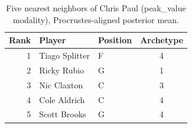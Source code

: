 \begin{table}[htbp]
  \centering\small
  \begin{tabular}{rllc}
    \toprule
    Rank & Player & Position & Archetype \\
    \midrule
    1 & Tiago Splitter & F & 4 \\
    2 & Ricky Rubio & G & 1 \\
    3 & Nic Claxton & C & 3 \\
    4 & Cole Aldrich & C & 4 \\
    5 & Scott Brooks & G & 4 \\
    \bottomrule
  \end{tabular}
  \caption{Five nearest neighbors of Chris Paul (peak_value modality), Procrustes-aligned posterior mean.}
  \label{tab:Chris_Paul_neighbors_peak_value}
\end{table}

